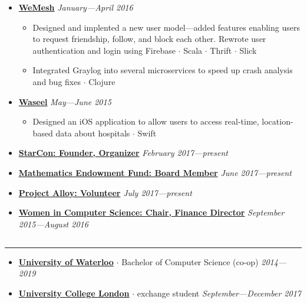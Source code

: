 \documentclass[5pt,letterpaper]{article}
\newcommand{\dt}{$\cdot$ }
\begin{document}
\begin{itemize}[leftmargin=1em, noitemsep]
  \item[]
    {\href{http://www.rave.io}{\textbf{WeMesh}} \hfill
    \emph{January---April 2016}}

    \begin{itemize}[label=\textbullet, noitemsep, nosep]
      \item Designed and implented a new user model---added features enabling
        users to request friendship, follow, and block each other. Rewrote user
        authentication and login using Firebase \dt Scala \dt Thrift \dt Slick
      \item Integrated Graylog into several microservices to speed up crash
        analysis and bug fixes \dt Clojure
    \end{itemize}

  \item[]
    {\href{https://www.waseel.com}{\textbf{Waseel}} \hfill
    \emph{May---June 2015}}

    \begin{itemize}[label=\textbullet, noitemsep]
      \item Designed an iOS application to allow users to access real-time,
        location-based data about hospitals \dt Swift
    \end{itemize}

  \item[]
    {\href{https://starcon.io}{\textbf{StarCon: Founder, Organizer}} \hfill
    \emph{February 2017---present}}

  \item[]
    {\href{https://uwaterloo.ca/math-endowment-fund/}{\textbf{Mathematics
    Endowment Fund: Board Member}} \hfill \emph{June 2017---present}}

  \item[]
    {\href{https://www.projectalloy.org/}{\textbf{Project Alloy: Volunteer}} \hfill
    \emph{July 2017---present}}

  \item[]
    {\href{http://wics.uwaterloo.ca}{\textbf{Women in Computer Science: Chair,
      Finance Director}} \hfill
    \emph{September 2015---August 2016}}

\end{itemize}


\subsection*{}
\hrule
\vspace{1.0em}
\begin{itemize}[leftmargin=1em, noitemsep]
  \item[]
    {\href{http://www.uwaterloo.ca}{\textbf{University of Waterloo}}} \dt Bachelor of Computer Science (co-op) \hfill \emph{2014---2019}
  \item[]
    {\href{https://www.ucl.ac.uk/}{\textbf{University College London}}} \dt exchange student
    \hfill \emph{September---December 2017}

\end{itemize}
\end{document}
